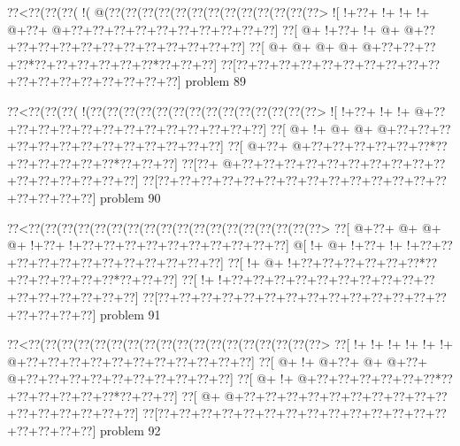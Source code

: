 \vbox{\vbox{\goo
\0??<\0??(\0??(\0??(\- !(\- @(\0??(\0??(\0??(\0??(\0??(\0??(\0??(\0??(\0??(\0??(\0??(\0??(\0??>
\- ![\- !+\0??+\- !+\- !+\- !+\- @+\0??+\- @+\0??+\0??+\0??+\0??+\0??+\0??+\0??+\0??+\0??+\0??]
\0??[\- @+\- !+\0??+\- !+\- @+\- @+\0??+\0??+\0??+\0??+\0??+\0??+\0??+\0??+\0??+\0??+\0??+\0??]
\0??[\- @+\- @+\- @+\- @+\- @+\0??+\0??+\0??+\0??*\0??+\0??+\0??+\0??+\0??+\0??*\0??+\0??+\0??]
\0??[\0??+\0??+\0??+\0??+\0??+\0??+\0??+\0??+\0??+\0??+\0??+\0??+\0??+\0??+\0??+\0??+\0??+\0??]
}
\hfil problem 89\hfil\break
}



\vbox{\vbox{\goo
\0??<\0??(\0??(\0??(\- !(\0??(\0??(\0??(\0??(\0??(\0??(\0??(\0??(\0??(\0??(\0??(\0??(\0??(\0??>
\- ![\- !+\0??+\- !+\- !+\- @+\0??+\0??+\0??+\0??+\0??+\0??+\0??+\0??+\0??+\0??+\0??+\0??+\0??]
\0??[\- @+\- !+\- @+\- @+\- @+\0??+\0??+\0??+\0??+\0??+\0??+\0??+\0??+\0??+\0??+\0??+\0??+\0??]
\0??[\- @+\0??+\- @+\0??+\0??+\0??+\0??+\0??+\0??*\0??+\0??+\0??+\0??+\0??+\0??*\0??+\0??+\0??]
\0??[\0??+\- @+\0??+\0??+\0??+\0??+\0??+\0??+\0??+\0??+\0??+\0??+\0??+\0??+\0??+\0??+\0??+\0??]
\0??[\0??+\0??+\0??+\0??+\0??+\0??+\0??+\0??+\0??+\0??+\0??+\0??+\0??+\0??+\0??+\0??+\0??+\0??]
}
\hfil problem 90\hfil\break
}



\vbox{\vbox{\goo
\0??<\0??(\0??(\0??(\0??(\0??(\0??(\0??(\0??(\0??(\0??(\0??(\0??(\0??(\0??(\0??(\0??(\0??(\0??>
\0??[\- @+\0??+\- @+\- @+\- @+\- !+\0??+\- !+\0??+\0??+\0??+\0??+\0??+\0??+\0??+\0??+\0??+\0??]
\- @[\- !+\- @+\- !+\0??+\- !+\- !+\0??+\0??+\0??+\0??+\0??+\0??+\0??+\0??+\0??+\0??+\0??+\0??]
\0??[\- !+\- @+\- !+\0??+\0??+\0??+\0??+\0??+\0??*\0??+\0??+\0??+\0??+\0??+\0??*\0??+\0??+\0??]
\0??[\- !+\- !+\0??+\0??+\0??+\0??+\0??+\0??+\0??+\0??+\0??+\0??+\0??+\0??+\0??+\0??+\0??+\0??]
\0??[\0??+\0??+\0??+\0??+\0??+\0??+\0??+\0??+\0??+\0??+\0??+\0??+\0??+\0??+\0??+\0??+\0??+\0??]
}
\hfil problem 91\hfil\break
}



\vbox{\vbox{\goo
\0??<\0??(\0??(\0??(\0??(\0??(\0??(\0??(\0??(\0??(\0??(\0??(\0??(\0??(\0??(\0??(\0??(\0??(\0??>
\0??[\- !+\- !+\- !+\- !+\- !+\- !+\- @+\0??+\0??+\0??+\0??+\0??+\0??+\0??+\0??+\0??+\0??+\0??]
\0??[\- @+\- !+\- @+\0??+\- @+\- @+\0??+\- @+\0??+\0??+\0??+\0??+\0??+\0??+\0??+\0??+\0??+\0??]
\0??[\- @+\- !+\- @+\0??+\0??+\0??+\0??+\0??+\0??*\0??+\0??+\0??+\0??+\0??+\0??*\0??+\0??+\0??]
\0??[\- @+\- @+\0??+\0??+\0??+\0??+\0??+\0??+\0??+\0??+\0??+\0??+\0??+\0??+\0??+\0??+\0??+\0??]
\0??[\0??+\0??+\0??+\0??+\0??+\0??+\0??+\0??+\0??+\0??+\0??+\0??+\0??+\0??+\0??+\0??+\0??+\0??]
}
\hfil problem 92\hfil\break
}



